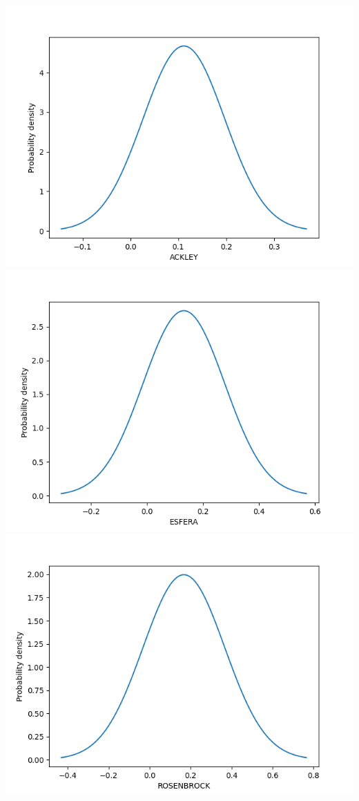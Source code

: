 \documentclass{article}
\begin{document}
\includegraphics[scale=0.5]{ES/ackley.png}
\includegraphics[scale=0.5]{ES/esfera.png}
\includegraphics[scale=0.5]{ES/rosenbrock.png}
\end{document}
